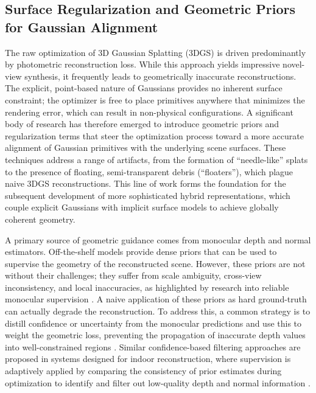 \documentclass[11pt]{article}
\begin{document}
\subsection{Surface Regularization and Geometric Priors for Gaussian Alignment}

The raw optimization of 3D Gaussian Splatting (3DGS) is driven predominantly by photometric reconstruction loss. While this approach yields impressive novel-view synthesis, it frequently leads to geometrically inaccurate reconstructions. The explicit, point-based nature of Gaussians provides no inherent surface constraint; the optimizer is free to place primitives anywhere that minimizes the rendering error, which can result in non-physical configurations. A significant body of research has therefore emerged to introduce geometric priors and regularization terms that steer the optimization process toward a more accurate alignment of Gaussian primitives with the underlying scene surfaces. These techniques address a range of artifacts, from the formation of ``needle-like'' splats to the presence of floating, semi-transparent debris (``floaters''), which plague naive 3DGS reconstructions. This line of work forms the foundation for the subsequent development of more sophisticated hybrid representations, which couple explicit Gaussians with implicit surface models to achieve globally coherent geometry.

A primary source of geometric guidance comes from monocular depth and normal estimators. Off-the-shelf models provide dense priors that can be used to supervise the geometry of the reconstructed scene. However, these priors are not without their challenges; they suffer from scale ambiguity, cross-view inconsistency, and local inaccuracies, as highlighted by research into reliable monocular supervision \cite{ref183,ref184}. A naive application of these priors as hard ground-truth can actually degrade the reconstruction. To address this, a common strategy is to distill confidence or uncertainty from the monocular predictions and use this to weight the geometric loss, preventing the propagation of inaccurate depth values into well-constrained regions \cite{ref183,ref184,ref185}. Similar confidence-based filtering approaches are proposed in systems designed for indoor reconstruction, where supervision is adaptively applied by comparing the consistency of prior estimates during optimization to identify and filter out low-quality depth and normal information \cite{ref186}.
\end{document}
